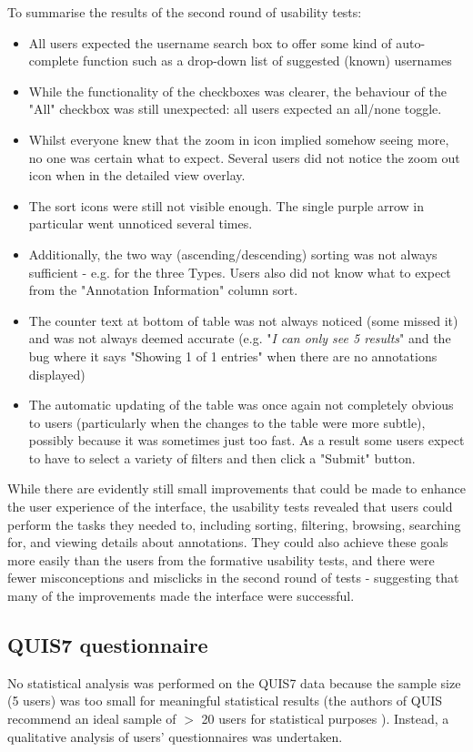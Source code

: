 To summarise the results of the second round of usability tests:
\begin{itemize}
\item All users expected the username search box to offer some kind of auto-complete function such as a drop-down list of suggested (known) usernames
\item While the functionality of the checkboxes was clearer, the behaviour of the "All" checkbox was still unexpected: all users expected an all/none toggle. 
\item Whilst everyone knew that the zoom in icon implied somehow seeing more, no one was certain what to expect. Several users did not notice the zoom out icon when in the detailed view overlay.
\item The sort icons were still not visible enough. The single purple arrow in particular went unnoticed several times. \item Additionally, the two way (ascending/descending) sorting was not always sufficient - e.g. for the three Types. Users also did not know what to expect from the "Annotation Information" column sort.
\item The counter text at bottom of table was not always noticed (some missed it) and was not always deemed accurate (e.g. "\textit{I can only see 5 results}" and the bug where it says "Showing 1 of 1 entries" when there are no annotations displayed)
\item The automatic updating of the table was once again not completely obvious to users (particularly when the changes to the table were more subtle), possibly because it was sometimes just too fast. As a result some users expect to have to select a variety of filters and then click a "Submit" button. 
\end{itemize}

While there are evidently still small improvements that could be made to enhance the user experience of the interface, the usability tests revealed that users could perform the tasks they needed to, including sorting, filtering, browsing, searching for, and viewing details about annotations. They could also achieve these goals more easily than the users from the formative usability tests, and there were fewer misconceptions and misclicks in the second round of tests - suggesting that many of the improvements made the interface were successful. 


\subsection{QUIS7 questionnaire}
No statistical analysis was performed on the QUIS7 data because the sample size (5 users) was too small for meaningful statistical results (the authors of QUIS recommend an ideal sample of $>$ 20 users for statistical purposes \citep{QUISquant}). Instead, a qualitative analysis of users' questionnaires was undertaken. 

